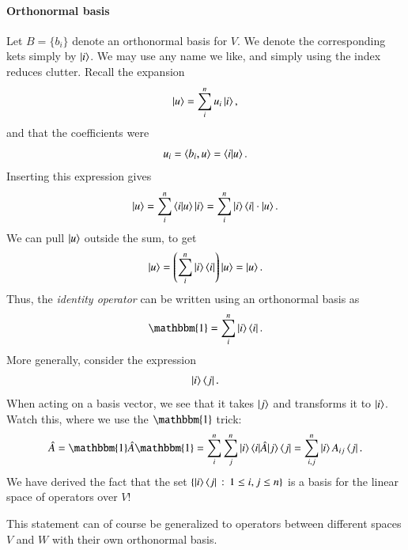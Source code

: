 \paragraph{Orthonormal basis}

Let $B = \{b_i\}$ denote an orthonormal basis for $V$. We denote the corresponding kets simply by $\ket{i}$. We may use any name we like, and simply using the index reduces clutter. Recall the expansion
\begin{equation}
    \ket{u} = \sum_i^n u_i \ket{i},
\end{equation}
and that the coefficients were
\begin{equation}
    u_i = \braket{b_i, u} = \braket{i|u}.
\end{equation}
Inserting this expression gives
\begin{equation}
    \ket{u} = \sum_i^n \braket{i|u} \ket{i} = \sum_i^n \ket{i}\braket{i|\cdot|u}.
\end{equation}
We can pull $\ket{u}$ outside the sum, to get
\begin{equation}
    \ket{u} = \left(\sum_i^n \ket{i}\bra{i}\right) \ket{u} = \ket{u}.
\end{equation}
Thus, the \emph{identity operator} can be written using an orthonormal basis as
\begin{equation}
    \mathbbm{1} = \sum_i^n \ket{i}\bra{i}.
\end{equation}
More generally, consider the expression
\begin{equation}
    \ket{i}\bra{j}.
\end{equation}
When acting on a basis vector, we see that it takes $\ket{j}$ and transforms it to $\ket{i}$. Watch this, where we use the $\mathbbm{1}$ trick:
\begin{equation}
    \hat{A} = \mathbbm{1}\hat{A} \mathbbm{1} = \sum_{i}^n \sum_j^n \ket{i}\braket{i|\hat{A}|j} \bra{j} = \sum_{i,j}^n \ket{i} A_{ij} \bra{j}.
\end{equation}
We have derived the fact that the set $\{ \ket{i}\bra{j} \,:\, 1\leq i,j\leq n\}$ is a basis for the linear space of operators over $V$!

This statement can of course be generalized to operators between different spaces $V$ and $W$ with their own orthonormal basis.

